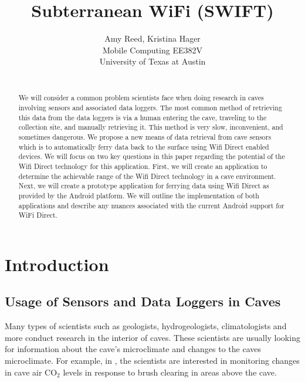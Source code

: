\documentclass[10pt,twocolumn]{article}
\begin{document}
\title{Subterranean WiFi (SWIFT)}

\author{Amy Reed, Kristina Hager\\
Mobile Computing EE382V\\
University of Texas at Austin\\
\\
}

\maketitle
\thispagestyle{empty}

\begin{abstract}
	We will consider a common problem scientists face when doing research in caves 
	involving sensors and associated data loggers.
	The most common method of retrieving this data from the data loggers is via a human entering 
	the cave, traveling to the collection site, and manually retrieving it. 
	This method is very slow, inconvenient, and sometimes dangerous.
	We propose a new means of data retrieval from cave sensors which is to automatically 
	ferry data back to the surface using Wifi Direct enabled devices. 
	We will focus on two key questions in this paper regarding the potential of the Wifi Direct technology for this application.
	First, we will create an application to determine the achievable range of the Wifi Direct technology in a cave environment.
	Next, we will create a prototype application for ferrying data using Wifi Direct as provided by the Android platform. 
	We will outline the implementation of both applications and describe any nuances associated with the current Android 
	support for WiFi Direct.
\end{abstract}

\tableofcontents

\section{Introduction}

\subsection{Usage of Sensors and Data Loggers in Caves}

Many types of scientists such as geologists, hydrogeologists, climatologists and more conduct research in the interior of caves. 
These scientists are usually looking for information about the cave's microclimate and changes to the caves microclimate. 
For example, in \cite{wong2010}, the scientists are interested in monitoring changes in cave air CO$_2$ levels in response to brush clearing in areas above the cave. 
\end{document}

